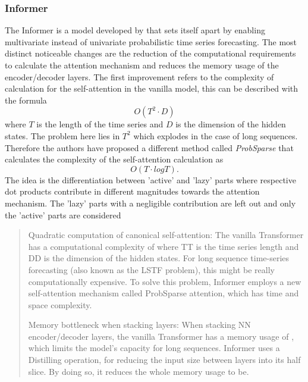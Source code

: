 \documentclass{article}
\begin{document}
\subsubsection{Informer}

The Informer is a model developed by \cite{Informer} that sets itself apart by enabling multivariate instead of univariate probabilistic time series forecasting. The most distinct noticeable changes are the reduction of the computational requirements to calculate the attention mechanism and reduces the memory usage of the encoder/decoder layers. The first improvement refers to the complexity of calculation for the self-attention in the vanilla model, this can be described with the formula
\begin{equation*}
    O(T^2 \cdot D)
\end{equation*}
where $T$ is the length of the time series and $D$ is the dimension of the hidden states. The problem here lies in $T^2$ which explodes in the case of long sequences. Therefore the authors have proposed a different method called \textit{ProbSparse} that calculates the complexity of the self-attention calculation as
\begin{equation*}
    O(T \cdot log{T}) .
\end{equation*}
The idea is the differentiation between 'active' and 'lazy' parts where respective dot products contribute in different magnitudes towards the attention mechanism. The 'lazy' parts with a negligible contribution are left out and only the 'active' parts are considered
\begin{quote}
    Quadratic computation of canonical self-attention:
    The vanilla Transformer has a computational complexity of  where TT is the time series length and DD is the dimension of the hidden states. For long sequence time-series forecasting (also known as the LSTF problem), this might be really computationally expensive. To solve this problem, Informer employs a new self-attention mechanism called ProbSparse attention, which has time and space complexity.
    
    Memory bottleneck when stacking layers:
    When stacking NN encoder/decoder layers, the vanilla Transformer has a memory usage of , which limits the model's capacity for long sequences. Informer uses a Distilling operation, for reducing the input size between layers into its half slice. By doing so, it reduces the whole memory usage to be.
\end{quote}
\end{document}
